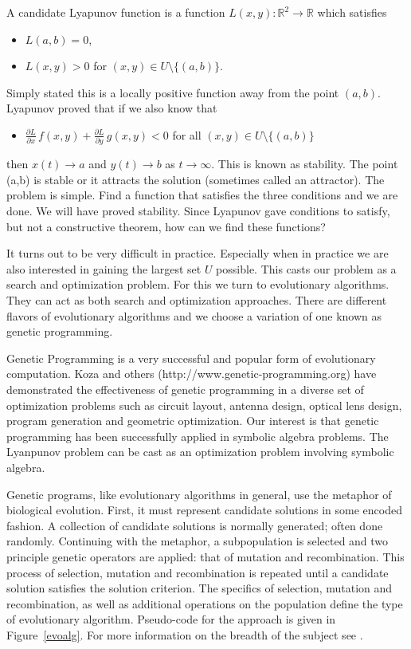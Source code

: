 \documentclass[12pt]{article}
\def      \RR             {{\mathbb R}}
\begin{document}
A candidate Lyapunov function is a function $L(x,y): {\RR}^2\to {\RR}$
which satisfies
\begin{itemize}
\item $L(a,b) = 0$,
\item  $L(x,y) > 0$ for $(x,y) \in U\setminus \{(a,b)\}$.
\end{itemize}
Simply stated this is a locally positive function away from the point
$(a,b)$.  Lyapunov proved that if we also know that 
\begin{itemize}
\item $\displaystyle \frac{\partial L}{\partial x}\, f(x,y) 
+ \frac{\partial L}{\partial y}\, g(x,y) < 0$ for all $(x,y) \in
U\setminus \{(a,b)\}$
\end{itemize}
then $x(t)\to a$ and $y(t)\to b$ as $t \to \infty$.  This is known as
stability.  The point (a,b) is stable or it attracts the solution
(sometimes called an attractor).  The problem is simple.  Find a
function that satisfies the three conditions and we are done. We will
have proved stability.   Since Lyapunov gave conditions to satisfy,
but not a constructive theorem, how can we find these functions?   

It turns out to be very difficult in practice.  Especially when in
practice we are also interested in gaining the largest set $U$
possible.  This casts our problem as a search and optimization
problem.  For this we turn to evolutionary algorithms.  They can act
as both search and optimization approaches.   There are different
flavors of evolutionary algorithms and we choose a variation of one
known as genetic programming.
 
Genetic Programming is a very successful and popular form of
evolutionary computation.  Koza and others (http://www.genetic-programming.org) have
demonstrated the effectiveness of genetic programming in a diverse set
of optimization problems such as circuit layout, antenna design,
optical lens design, program generation and geometric optimization.
Our interest is that genetic programming has been successfully applied
in symbolic algebra problems.  The Lyanpunov problem can be cast as an
optimization problem involving symbolic algebra.


Genetic programs, like evolutionary algorithms in general, use the
metaphor of biological evolution.  First, it must represent candidate
solutions in some encoded fashion.  A collection of candidate
solutions is normally generated; often done randomly.  Continuing with
the metaphor, a subpopulation is selected and two principle genetic
operators are applied: that of mutation and recombination.  This
process of selection, mutation and recombination is repeated until a
candidate solution satisfies the solution criterion.  The specifics of
selection, mutation and recombination, as well as additional
operations on the population define the type of evolutionary
algorithm. Pseudo-code for the approach is given in
Figure~\ref{evoalg}.  For more information on the breadth of the
subject see \cite{banzhaf:1997:book, fogel:1998:ecfr,
  goldberg:1988:gaml}.
\end{document}
